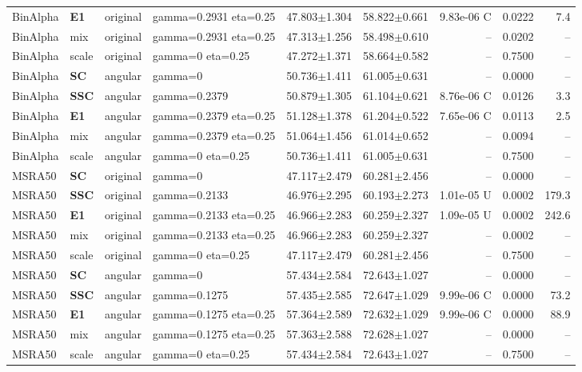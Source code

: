 \begin{longtable}{lllp{.14\linewidth}rrrrr}
BinAlpha & \textbf{E1} & original & gamma=0.2931 eta=0.25 & 47.803$\pm$1.304 & 58.822$\pm$0.661 & 9.83e-06 C & 0.0222 & 7.4\\
BinAlpha & mix & original & gamma=0.2931 eta=0.25 & 47.313$\pm$1.256 & 58.498$\pm$0.610 & -- & 0.0202 & --\\
BinAlpha & scale & original & gamma=0 eta=0.25 & 47.272$\pm$1.371 & 58.664$\pm$0.582 & -- & 0.7500 & --\\
BinAlpha & \textbf{SC} & angular & gamma=0 & 50.736$\pm$1.411 & 61.005$\pm$0.631 & -- & 0.0000 & --\\
BinAlpha & \textbf{SSC} & angular & gamma=0.2379 & 50.879$\pm$1.305 & 61.104$\pm$0.621 & 8.76e-06 C & 0.0126 & 3.3\\
BinAlpha & \textbf{E1} & angular & gamma=0.2379 eta=0.25 & 51.128$\pm$1.378 & 61.204$\pm$0.522 & 7.65e-06 C & 0.0113 & 2.5\\
BinAlpha & mix & angular & gamma=0.2379 eta=0.25 & 51.064$\pm$1.456 & 61.014$\pm$0.652 & -- & 0.0094 & --\\
BinAlpha & scale & angular & gamma=0 eta=0.25 & 50.736$\pm$1.411 & 61.005$\pm$0.631 & -- & 0.7500 & --\\
MSRA50 & \textbf{SC} & original & gamma=0 & 47.117$\pm$2.479 & 60.281$\pm$2.456 & -- & 0.0000 & --\\
MSRA50 & \textbf{SSC} & original & gamma=0.2133 & 46.976$\pm$2.295 & 60.193$\pm$2.273 & 1.01e-05 U & 0.0002 & 179.3\\
MSRA50 & \textbf{E1} & original & gamma=0.2133 eta=0.25 & 46.966$\pm$2.283 & 60.259$\pm$2.327 & 1.09e-05 U & 0.0002 & 242.6\\
MSRA50 & mix & original & gamma=0.2133 eta=0.25 & 46.966$\pm$2.283 & 60.259$\pm$2.327 & -- & 0.0002 & --\\
MSRA50 & scale & original & gamma=0 eta=0.25 & 47.117$\pm$2.479 & 60.281$\pm$2.456 & -- & 0.7500 & --\\
MSRA50 & \textbf{SC} & angular & gamma=0 & 57.434$\pm$2.584 & 72.643$\pm$1.027 & -- & 0.0000 & --\\
MSRA50 & \textbf{SSC} & angular & gamma=0.1275 & 57.435$\pm$2.585 & 72.647$\pm$1.029 & 9.99e-06 C & 0.0000 & 73.2\\
MSRA50 & \textbf{E1} & angular & gamma=0.1275 eta=0.25 & 57.364$\pm$2.589 & 72.632$\pm$1.029 & 9.99e-06 C & 0.0000 & 88.9\\
MSRA50 & mix & angular & gamma=0.1275 eta=0.25 & 57.363$\pm$2.588 & 72.628$\pm$1.027 & -- & 0.0000 & --\\
MSRA50 & scale & angular & gamma=0 eta=0.25 & 57.434$\pm$2.584 & 72.643$\pm$1.027 & -- & 0.7500 & --\\

\end{longtable}
